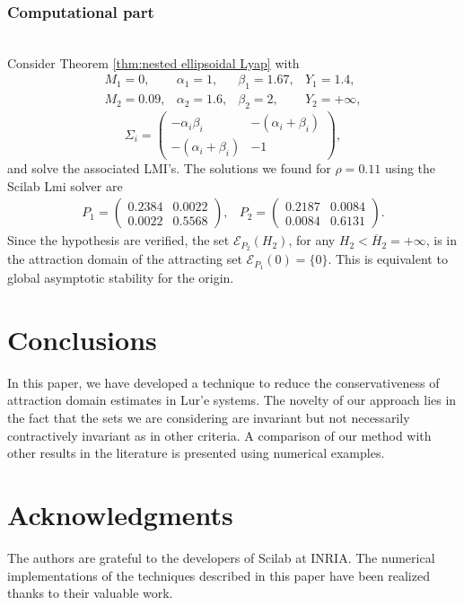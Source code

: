 \documentclass[letterpaper,10pt,twocolumn,journal,final]{IEEEtran}
\newcommand{\ellips}{\mathcal{E}}
\begin{document}
\subsubsection{Computational part}
~\\
Consider Theorem \ref{thm:nested ellipsoidal Lyap} with
\begin{equation}
	\begin{array}{llll}
	M_1=0,		&\alpha_1=1, 	&\beta_1=1.67,	& Y_1=1.4, \\
	M_2=0.09, 	&\alpha_2=1.6, 	&\beta_2=2,	& Y_2=+\infty,
	\end{array}
\end{equation}
\begin{equation}
	\Sigma_i=	\left(\begin{array}{cc}
				-\alpha_i\beta_i & -(\alpha_i+\beta_i)\\ -(\alpha_i+\beta_i) & -1
			\end{array}\right),
\end{equation}
and solve the associated LMI's. The solutions we found for $\rho=0.11$ using the Scilab Lmi solver are
\begin{align}
	P_1=	\left(\begin{array}{cc}
			0.2384 & 0.0022\\ 0.0022 & 0.5568
		\end{array}\right),
	&P_2=	\left(\begin{array}{cc}
			0.2187 & 0.0084\\ 0.0084 & 0.6131
		\end{array}\right).
\end{align}
Since the hypothesis are verified, the set $\ellips_{P_2}(H_2)$, for any $H_2<\overline{H}_2=+\infty$, is in the attraction domain of the attracting set $\ellips_{P_1}(0)=\{0\}$. This is equivalent to global asymptotic stability for the origin.

\section{Conclusions}
In this paper, we have developed a technique to reduce the conservativeness of attraction domain estimates in Lur'e systems. The novelty of our approach lies in the fact that the sets we are considering are invariant but not necessarily contractively invariant as in other criteria. A comparison of our method with other results in the literature is presented using numerical examples.

\section*{Acknowledgments}
The authors are grateful to the developers of Scilab at INRIA. The numerical implementations of the techniques described in this paper have been realized thanks to their valuable work.


\end{document}
